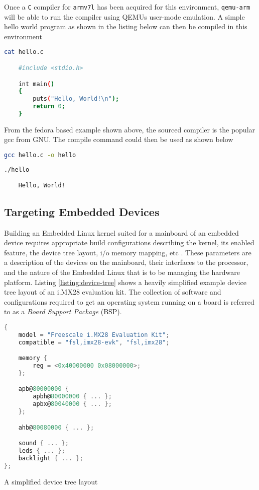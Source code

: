 Once a \texttt{C} compiler for \texttt{armv7l} has been acquired for this environment, \texttt{qemu-arm} will be able to run the compiler using QEMU\textquotesingle s user-mode emulation. A simple hello world program as shown in the listing below can then be compiled in this environment

\begin{lstlisting}[language=Bash]
	cat hello.c

	#include <stdio.h>

	int main()
	{
		puts("Hello, World!\n");
		return 0;
	}
\end{lstlisting}

From the fedora based example shown above, the sourced compiler is the popular gcc from GNU. The compile command could then be used as shown below

\begin{lstlisting}[language=Bash]
	gcc hello.c -o hello
\end{lstlisting}

\begin{lstlisting}[language=Bash]
	./hello

	Hello, World!
\end{lstlisting}


\subsection{Targeting Embedded Devices}

Building an Embedded Linux kernel suited for a mainboard of an embedded device requires appropriate build configurations describing the kernel, its enabled feature, the device tree layout, i/o memory mapping, etc \cite{bootlin-port}. These parameters are a description of the devices on the mainboard, their interfaces to the processor, and the nature of the Embedded Linux that is to be managing the hardware platform. Listing \ref{listing:device-tree} shows a heavily simplified example device tree layout of an i.MX28 evaluation kit. The collection of software and configurations required to get an operating system running on a board is referred to as a \textit{Board Support Package} (BSP).

\begin{lstfloat}
\begin{lstlisting}[language=C]
{
	model = "Freescale i.MX28 Evaluation Kit";
	compatible = "fsl,imx28-evk", "fsl,imx28";

	memory {
		reg = <0x40000000 0x08000000>;
	};

	apb@80000000 {
		apbh@80000000 { ... };
		apbx@80040000 { ... };
	};

	ahb@80080000 { ... };

	sound { ... };
	leds { ... };
	backlight { ... };
};
\end{lstlisting}
\caption{A simplified device tree layout}
\label{listing:device-tree}
\end{lstfloat}

